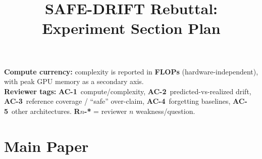 \documentclass{article}
\title{SAFE-DRIFT Rebuttal: Experiment Section Plan}
\date{}
\begin{document}
\maketitle

\noindent\textbf{Compute currency:} complexity is reported in \textbf{FLOPs} (hardware-independent), with peak GPU memory as a secondary axis.\\
\textbf{Reviewer tags:} \textbf{AC-1}~compute/complexity, \textbf{AC-2}~predicted-vs-realized drift, \textbf{AC-3}~reference coverage / ``safe'' over-claim, \textbf{AC-4}~forgetting baselines, \textbf{AC-5}~other architectures. \textbf{R$n$-*} = reviewer $n$ weakness/question.

\vspace{1em}
\section*{Main Paper}
\end{document}
